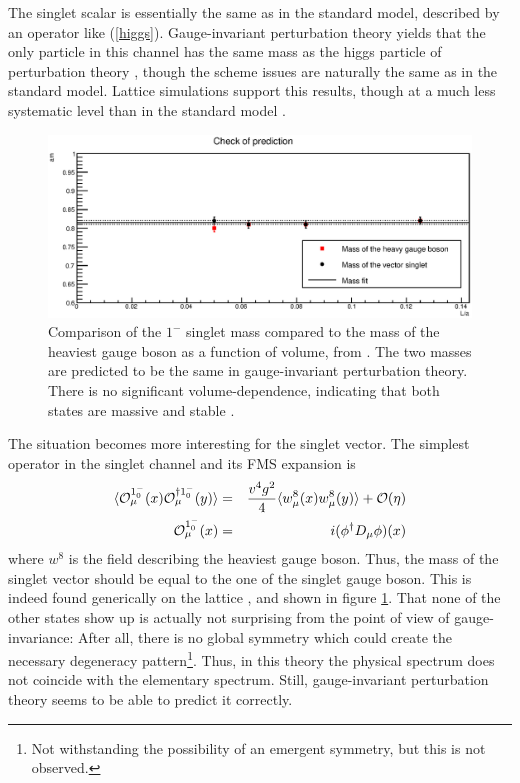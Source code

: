 \documentclass[final,12pt]{article}
\newcommand*{\no}{\noindent}
\newcommand*{\bea}{\begin{eqnarray}}
\newcommand*{\eea}{\end{eqnarray}}
\newcommand*{\pref}[1]{(\ref{#1})}
\newcommand*{\nn}{\nonumber}
\newcommand*{\1}{1\!\!\!\bot}
\newcommand*{\op}{{\cal O}}
\begin{document}
The singlet scalar is essentially the same as in the standard model, described by an operator like \pref{higgs}. Gauge-invariant perturbation theory yields that the only particle in this channel has the same mass as the higgs particle of perturbation theory \cite{Torek:2015ssa,Maas:2016ngo,Maas:2017xzh}, though the scheme issues are naturally the same as in the standard model. Lattice simulations support this results, though at a much less systematic level than in the standard model \cite{Maas:2016ngo,Maas:unpublishedtoerek}.

\begin{figure}
\begin{minipage}{0.7\linewidth}
\includegraphics[width=\linewidth]{EffMassFitParams}
\end{minipage}
\begin{minipage}{0.3\linewidth}
\caption{\label{fig:gut2}Comparison of the $1^-$ singlet mass compared to the mass of the heaviest gauge boson as a function of volume, from \cite{Maas:2016ngo}. The two masses are predicted to be the same in gauge-invariant perturbation theory. There is no significant volume-dependence, indicating that both states are massive and stable \cite{Luscher:1985dn}.}
\end{minipage}
\end{figure}

The situation becomes more interesting for the singlet vector. The simplest operator in the singlet channel and its FMS expansion is \cite{Torek:2015ssa,Maas:2016ngo}
\bea
\langle \op_\mu^{1^-_0}(x) \op^{\dagger1^-_0}_\mu(y)\rangle&=& \frac{v^4g^2}{4}\langle w_\mu^8(x)w_\mu^8(y)\rangle + \mathcal{O}(\eta)\label{su3w}\\
\op_\mu^{1^-_0}(x) &=& i(\phi^\dagger D_\mu \phi)(x)\nn
\eea
\no where $w^8$ is the field describing the heaviest gauge boson. Thus, the mass of the singlet vector should be equal to the one of the singlet gauge boson. This is indeed found generically on the lattice \cite{Maas:2016ngo,Maas:unpublishedtoerek}, and shown in figure \ref{fig:gut2}. That none of the other states show up is actually not surprising from the point of view of gauge-invariance: After all, there is no global symmetry which could create the necessary degeneracy pattern\footnote{Not withstanding the possibility of an emergent symmetry, but this is not observed.}. Thus, in this theory the physical spectrum does not coincide with the elementary spectrum. Still, gauge-invariant perturbation theory seems to be able to predict it correctly.
\end{document}
